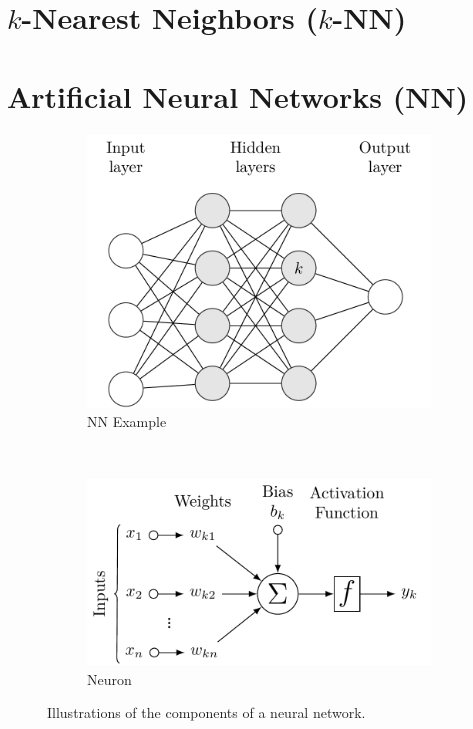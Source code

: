 \section{\texorpdfstring{$k$}{k}-Nearest Neighbors (\texorpdfstring{$k$}{k}-NN)}
\label{class:kNN}

\section{Artificial Neural Networks (NN)}
\label{class:ANN}


\begin{figure}[H]
  \centering
  \begin{subfigure}[b]{0.48\textwidth}\centering
      \includegraphics[width=\textwidth]{figures/ml/NN_diagram/NN_diagram}
  \caption{NN Example}
  \label{fig:NN:ex}
  \end{subfigure}
  ~
  \begin{subfigure}[b]{0.48\textwidth}\centering
      \includegraphics[width=\textwidth]{figures/ml/NN_neuron/NN_neuron}
  \caption{Neuron}
  \label{fig:NN:Neuron}
  \end{subfigure}
\caption{
Illustrations of the components of a neural network.
\label{fig:NN}
}
\end{figure}

